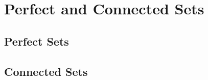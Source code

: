 \newpage
\section[Day 9: Perfect \& Connected Sets]{Perfect and Connected Sets}





\subsection{ Perfect Sets }





\subsection{ Connected Sets }
























































